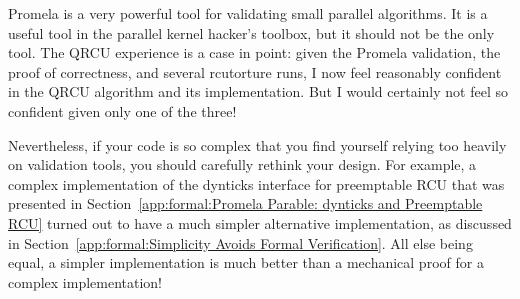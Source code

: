 Promela is a very powerful tool for validating small parallel algorithms.
It is a useful tool in the parallel kernel hacker's toolbox, but
it should not be the only tool.
The QRCU experience is a case in point: given the Promela validation,
the proof of correctness, and several
rcutorture
runs, I now feel
reasonably confident in the QRCU algorithm and its implementation.
But I would certainly not feel so confident given only one of the three!

Nevertheless, if your code is so complex that you find yourself
relying too heavily on validation
tools, you should carefully rethink your design.
For example, a complex implementation of the dynticks interface for
preemptable RCU that was presented in
Section~\ref{app:formal:Promela Parable: dynticks and Preemptable RCU}
turned out to
have a much simpler alternative implementation, as discussed in
Section~\ref{app:formal:Simplicity Avoids Formal Verification}.
All else being equal, a simpler implementation is much better than
a mechanical proof for a complex implementation!
